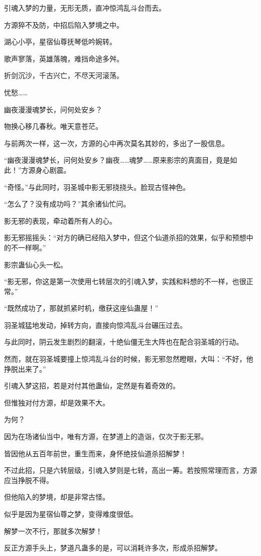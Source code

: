 \begin{this_body}
引魂入梦的力量，无形无质，直冲惊鸿乱斗台而去。

方源猝不及防，中招后陷入梦境之中。

湖心小亭，星宿仙尊抚琴低吟婉转。

歌声寥落，英雄落魄，难挡命途多舛。

折剑沉沙，千古兴亡，不尽天河滚荡。

忧愁……

幽夜漫漫魂梦长，问何处安乡？

物换心移几春秋。唯天意苍茫。

与前两次一样，这一次，方源的心中再次莫名其妙的，多出了一股信息。

“幽夜漫漫魂梦长，问何处安乡？幽夜……魂梦……原来影宗的真面目，竟是如此！”方源身心剧震。

“奇怪。”与此同时，羽圣城中影无邪挠挠头。脸现古怪神色。

“怎么了？没有成功吗？”其余诸仙忙问。

影无邪的表现，牵动着所有人的心。

影无邪摇摇头：“对方的确已经陷入梦中，但这个仙道杀招的效果，似乎和预想中的不一样啊。”

影宗蛊仙心头一松。

“影无邪，你这是第一次使用七转层次的引魂入梦，实践和料想的不一样，也很正常。”

“既然成功了，那就抓紧时机，缴获这座仙蛊屋！”

羽圣城猛地发动，掉转方向，直接向惊鸿乱斗台碾压过去。

与此同时，阴云发生剧烈的翻滚，十绝仙僵无生大阵也在配合羽圣城的行动。

然而，就在羽圣城要撞上惊鸿乱斗台的时候，影无邪忽然瞪眼，大叫：“不好，他挣脱出来了。”

引魂入梦这招，若是对付其他蛊仙，定然是有着奇效的。

但惟独对付方源，却是效果不大。

为何？

因为在场诸仙当中，唯有方源，在梦道上的造诣，仅次于影无邪。

皆因他从五百年前世，重生而来，身怀绝技仙道杀招解梦！

不过此招，只是六转层级，引魂入梦则是七转，高出一筹。若按照常理而言，方源应当挣脱不得。

但他陷入的梦境，却是非常古怪。

似乎是因为星宿仙尊之梦，变得难度很低。

解梦一次不行，那就多次解梦！

反正方源手头上，梦道凡蛊多的是，可以消耗许多次，形成杀招解梦。


\end{this_body}
